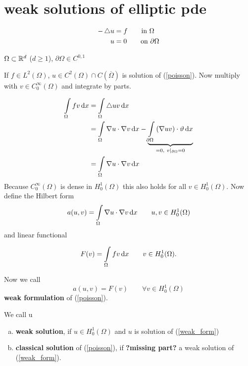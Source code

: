 
\section{weak solutions of elliptic pde}

\begin{example}
	\begin{align}\label{poisson}
	-\mathop{}\!\mathbin\bigtriangleup u &= f \qquad \text{in } \Omega \\
	u &= 0 \qquad \text{on } \partial \Omega \nonumber
	\end{align}
	
	$\Omega \subset \mathbb{R}^d $ ($d \geq 1$), $\partial \Omega \in C^{0,1}$
\end{example}

If $f \in L^2(\Omega)$, $u \in C^2(\Omega)\cap C(\overline{\Omega})$ is solution of (\ref{poisson}). Now multiply with $v \in C^\infty_0 (\Omega)$ and integrate by parts.

\begin{align*}
	\int \limits_\Omega fv \mathop{}\!\mathrm{d} x &= \int \limits_\Omega \mathop{}\!\mathbin\bigtriangleup uv \mathop{}\!\mathrm{d} x\\
								   &= \int \limits_\Omega \nabla u \cdot \nabla v \mathop{}\!\mathrm{d} x - \underbrace{\int \limits_{\partial \Omega} \left( \nabla uv\right)\cdot \vartheta \mathop{}\!\mathrm{d} x}_{=0,\ v|_{\partial \Omega} = 0} \\
								   &= \int \limits_\Omega \nabla u \cdot \nabla v \mathop{}\!\mathrm{d} x
\end{align*}
Because $C^\infty_0(\Omega)$ is dense in $H^1_0(\Omega)$ this also holds for all $v \in H^1_0(\Omega)$. Now define the Hilbert form
\begin{equation*}
	a(u,v) = \int \limits_\Omega \nabla u \cdot \nabla v \mathop{}\!\mathrm{d} x \qquad u,v\in H^1_0(\Omega)
\end{equation*}
and linear functional

\begin{equation*}
	F(v) = \int \limits_\Omega fv \mathop{}\!\mathrm{d} x \qquad v \in H^1_0(\Omega).
\end{equation*}

Now we call 
\begin{equation}\label{weak_form}
	a(u,v) = F(v) \qquad \forall v \in  H^1_0(\Omega)
\end{equation}
\textbf{weak formulation} of (\ref{poisson}).\enter


We call u
\begin{enumerate}[(a)]
	\item \textbf{weak solution}, if $u \in  H^1_0(\Omega)$ and $u$ is solution of (\ref{weak_form})\\
	\item \textbf{classical solution} of (\ref{poisson}), if \textbf{?missing part?} a weak solution of (\ref{weak_form}). 
\end{enumerate}

